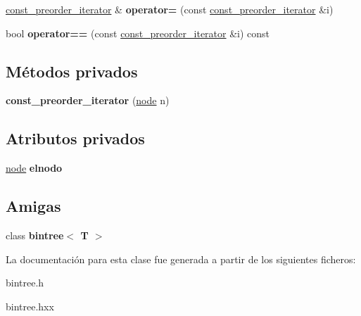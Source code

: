 \begin{DoxyCompactItemize}
\item 
\hypertarget{classbintree_1_1const__preorder__iterator_a7892239db01c504a435cac55d1de5188}{}\hyperlink{classbintree_1_1const__preorder__iterator}{const\+\_\+preorder\+\_\+iterator} \& {\bfseries operator=} (const \hyperlink{classbintree_1_1const__preorder__iterator}{const\+\_\+preorder\+\_\+iterator} \&i)\label{classbintree_1_1const__preorder__iterator_a7892239db01c504a435cac55d1de5188}

\item 
\hypertarget{classbintree_1_1const__preorder__iterator_a5378c460ff8159f21fcac315a3dc490c}{}bool {\bfseries operator==} (const \hyperlink{classbintree_1_1const__preorder__iterator}{const\+\_\+preorder\+\_\+iterator} \&i) const \label{classbintree_1_1const__preorder__iterator_a5378c460ff8159f21fcac315a3dc490c}

\end{DoxyCompactItemize}
\subsection*{Métodos privados}
\begin{DoxyCompactItemize}
\item 
\hypertarget{classbintree_1_1const__preorder__iterator_a7235cdec86289c4a25e4a7eae4f20ecd}{}{\bfseries const\+\_\+preorder\+\_\+iterator} (\hyperlink{classbintree_1_1node}{node} n)\label{classbintree_1_1const__preorder__iterator_a7235cdec86289c4a25e4a7eae4f20ecd}

\end{DoxyCompactItemize}
\subsection*{Atributos privados}
\begin{DoxyCompactItemize}
\item 
\hypertarget{classbintree_1_1const__preorder__iterator_a540e4db7576723ce1c62e9639748a6ae}{}\hyperlink{classbintree_1_1node}{node} {\bfseries elnodo}\label{classbintree_1_1const__preorder__iterator_a540e4db7576723ce1c62e9639748a6ae}

\end{DoxyCompactItemize}
\subsection*{Amigas}
\begin{DoxyCompactItemize}
\item 
\hypertarget{classbintree_1_1const__preorder__iterator_a300e602ae13bd21fa092c5a5899e9eda}{}class {\bfseries bintree$<$ T $>$}\label{classbintree_1_1const__preorder__iterator_a300e602ae13bd21fa092c5a5899e9eda}

\end{DoxyCompactItemize}


La documentación para esta clase fue generada a partir de los siguientes ficheros\+:\begin{DoxyCompactItemize}
\item 
bintree.\+h\item 
bintree.\+hxx\end{DoxyCompactItemize}
